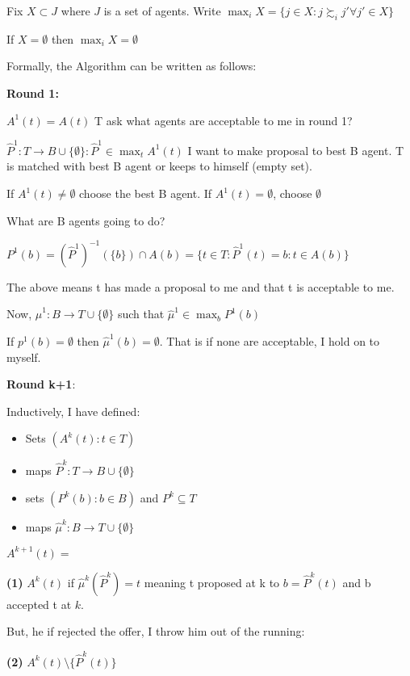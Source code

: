 \documentclass[11pt]{article}
\providecommand{\tightlist}{%
      \setlength{\itemsep}{0pt}\setlength{\parskip}{0pt}}
\begin{document}
    Fix \(X \subset J\) where \(J\) is a set of agents. Write
\(\max_i X = \{j \in X: j \succsim_i j' \forall j' \in X\}\)

If \(X = \emptyset\) then \(\max_i X = \emptyset\)

    Formally, the Algorithm can be written as follows:

\textbf{Round 1:}

\(A^1(t) = A(t)\) T ask what agents are acceptable to me in round 1?

\(\hat{P}^1 : T \rightarrow B \cup \{\emptyset\} : \hat{P}^1 \in \max_t A^1(t)\)
I want to make proposal to best B agent. T is matched with best B agent
or keeps to himself (empty set).

If \(A^1(t) \ne \emptyset\) choose the best B agent. If
\(A^1(t) = \emptyset\), choose \(\emptyset\)

What are B agents going to do?

\(P^1(b) = (\hat{P}^1)^{-1}(\{b\}) \cap A(b) = \{t \in T: \hat{P}^1(t) = b : t \in A(b)\}\)

The above means t has made a proposal to me and that t is acceptable to
me.

    Now, \(\hat{\mu}^1: B \rightarrow T \cup \{\emptyset\}\) such that
\(\hat{\mu}^1 \in \max_b P^1(b)\)

If \(p^1(b) = \emptyset\) then \(\hat{\mu}^1(b) = \emptyset\). That is
if none are acceptable, I hold on to myself.

    \textbf{Round k+1}:

Inductively, I have defined:

\begin{itemize}
\tightlist
\item
  Sets \((A^k(t): t \in T)\)
\item
  maps \(\hat{P}^k: T \rightarrow B \cup \{\emptyset\}\)
\item
  sets \((P^k(b): b \in B)\) and \(P^k \subseteq T\)
\item
  maps \(\hat{\mu}^k: B \rightarrow T \cup \{\emptyset\}\)
\end{itemize}

    \(A^{k+1}(t) =\)

\textbf{(1)} \(A^k(t)\) if \(\hat{\mu}^k(\hat{P}^k) = t\) meaning t
proposed at k to \(b = \hat{P}^k(t)\) and b accepted t at \(k\).

But, he if rejected the offer, I throw him out of the running:

\textbf{(2)} \(A^k(t) \setminus \{\hat{P}^k(t)\}\)
\end{document}
